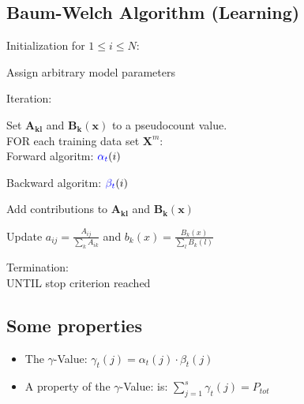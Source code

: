 \begin{minipage}[t]{0.49\textwidth}

\subsection{Baum-Welch Algorithm (Learning)}

\begin{aufzaehlung}
	\item Initialization for $1\leq i \leq N$:\\
	
	\vspace{-0.3cm}
	
	Assign arbitrary model parameters\\

	\item Iteration:\\
			
	\vspace{-0.3cm}
	
	Set $\bm{A_{kl}}$ and $\bm{B_{k}(x)}$ to a pseudocount value.\\
	
	FOR  each training data set $\bm{X}^m$:\\
	
	\qquad Forward algoritm: $\textcolor{blue}{\alpha_t}(i)$
	
	\qquad Backward algoritm: $\textcolor{blue}{\beta_t}(i)$
	
	\qquad Add contributions to $\bm{A_{kl}}$ and $\bm{B_{k}(x)}$
	
	\qquad Update $a_{ij}=\frac{A_{ij}}{\sum\limits_{k}^{}{A_{ik}}}$ and $b_k(x)=\frac{B_k(x)}{\sum\limits_{l}^{}{B_{k}(l)}}$
	
	\item Termination:\\
		
	UNTIL stop criterion reached
		
\end{aufzaehlung}	 
\end{minipage}

\subsection{Some properties}
\begin{itemize}
	\item The $\gamma$-Value: $\boxed{\gamma_t(j)=\alpha_t(j)\cdot\beta_t(j)}$
	\item A property of the $\gamma$-Value: is: $\boxed{\sum\limits_{j=1}^{s}{\gamma_t(j)=P_{tot}}}$
\end{itemize}




